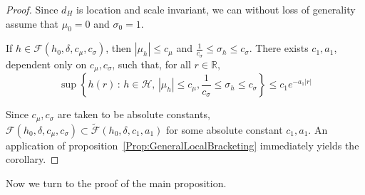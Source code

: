 \documentclass[12pt]{article}
\begin{document}
\begin{proof}

  Since $d_H$ is location and scale invariant, we can without loss of generality assume that $\mu_0 = 0$ and $\sigma_0 = 1$.

  If $h \in \mathcal{F}(h_0, \delta, c_\mu, c_\sigma)$, then $|\mu_h| \leq c_\mu$ and $\frac{1}{c_{\sigma}} \leq \sigma_h \leq c_\sigma$. There exists $c_1, a_1$, dependent only on $c_\mu, c_\sigma$, such that, for all $r \in \mathbb{R}$,
  \[
    \sup \left\{ h(r) \,:\, h \in \mathcal{H},\, |\mu_h| \leq c_\mu, \frac{1}{c_{\sigma}} \leq \sigma_h \leq c_\sigma \right\}
    \leq c_1 e^{ - a_1 |r|}
  \]
  
  Since $c_\mu, c_\sigma$ are taken to be absolute constants, $\mathcal{F}(h_0, \delta, c_\mu, c_\sigma) \subset \tilde{\mathcal{F}}(h_0, \delta, c_1, a_1)$ for some absolute constant $c_1, a_1$. An application of proposition~\ref{Prop:GeneralLocalBracketing} immediately yields the corollary.
\end{proof}


Now we turn to the proof of the main proposition. 
\end{document}
